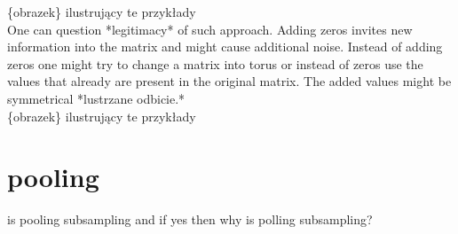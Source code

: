 \documentclass[a4paper,10pt]{report}
\begin{document}
      \{obrazek\} ilustrujący te przykłady \\
	  
      One can question *legitimacy* of such approach. Adding zeros invites new information into the matrix and might cause additional noise. Instead of adding zeros one might try to change a matrix into torus or instead of zeros use the values that already are present in the original matrix. The added values might be symmetrical *lustrzane odbicie.*\\
	  
      \{obrazek\} ilustrujący te przykłady 
      
    \section{pooling}	  
      is pooling subsampling and if yes then why is polling subsampling?\\

    
\end{document}
